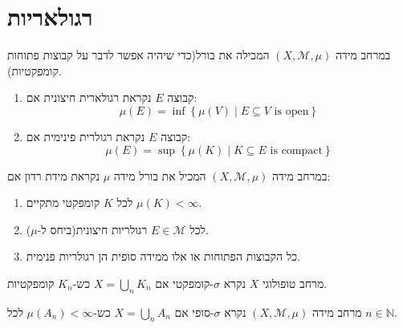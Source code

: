 \documentclass{tstextbook}
\begin{document}
\section{רגולאריות}

\begin{definition}
במרחב מידה \(\left( X,\mathcal{M},\mu \right)\) המכילה את בורל(כדי שיהיה אפשר לדבר על קבוצות פתוחות קומפקטיות).

  \begin{enumerate}
    \item קבוצה \(E\) נקראת רגולארית חיצונית אם: 
$$\mu(E)=\inf \left\{  \mu(V)\mid E \subseteq V \text{ is open}  \right\}$$


    \item קבוצה \(E\) נקראת רגולרית פינימית אם: 
$$\mu(E)=\sup  \left\{  \mu(K)\mid K \subseteq E \text{ is compact}  \right\}$$


  \end{enumerate}
\end{definition}
\begin{definition}
במרחב מידה \(\left( X,\mathcal{M},\mu \right)\) המכיל את בורל מידה \(\mu\) נקראת מידת רדון אם:

  \begin{enumerate}
    \item לכל \(K\) קומפקטי מתקיים \(\mu(K)<\infty\). 


    \item לכל \(E \in \mathcal{M}\) רגולריות חיצונית(ביחס ל-\(\mu\)). 


    \item כל הקבוצות הפתוחות או אלו ממידה סופית הן רגולריות פנימית. 


  \end{enumerate}
\end{definition}
\begin{definition}
מרחב טופולוגי \(X\) נקרא \(\sigma\)-קומפקטי אם \(X=\bigcup_{n}K_{n}\) כש-\(K_{n}\) קומפקטיות.

\end{definition}
\begin{definition}
מרחב מידה \(\left( X,\mathcal{M},\mu \right)\) נקרא \(\sigma\)-סופי אם \(X=\bigcup_{n}A_{n}\) כש-\(\mu(A_{n})<\infty\) לכל \(n \in \mathbb{N}\).

\end{definition}
\end{document}
